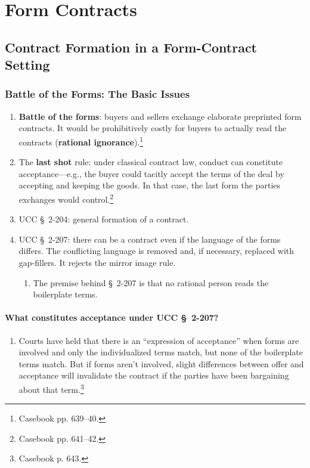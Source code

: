 \section{Form Contracts}

\subsection{Contract Formation in a Form-Contract Setting}

\subsubsection{Battle of the Forms: The Basic Issues}

\begin{enumerate}
    \item \textbf{Battle of the forms}: buyers and sellers exchange elaborate 
    preprinted form contracts. It would be prohibitively costly for buyers to 
    actually read the contracts (\textbf{rational 
    ignorance}).\footnote{Casebook pp. 639--40.}
    \item  The \textbf{last shot} rule: under classical contract law, conduct 
    can constitute acceptance---e.g., the buyer could tacitly accept the 
    terms of the deal by accepting and keeping the goods. In that case, the 
    last form the parties exchanges would control.\footnote{Casebook pp. 
    641--42.}
    \item UCC \S\ 2-204: general formation of a contract.
    \item UCC \S\ 2-207: there can be a contract even if the language of the 
    forms differs. The conflicting language is removed and, if necessary, 
    replaced with gap-fillers. It rejects the mirror image rule.
    \begin{enumerate}
        \item The premise behind \S\ 2-207 is that no rational person reads 
        the boilerplate terms.
    \end{enumerate}
\end{enumerate}

\paragraph{What constitutes acceptance under UCC \S\ 2-207?}

\begin{enumerate}
    \item Courts have held that there is an ``expression of acceptance'' when 
    forms are involved and only the individualized terms match, but none of 
    the boilerplate terms match. But if forms aren't involved, slight 
    differences between offer and acceptance will invalidate the contract if 
    the parties have been bargaining about that term.\footnote{Casebook p. 
    643.}
\end{enumerate}

